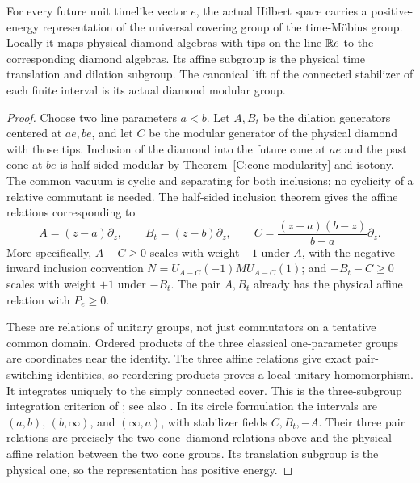 \begin{theorem}\label{C:time-mobius}
For every future unit timelike vector $e$, the actual
Hilbert space carries a positive-energy representation
of the universal covering group of the time-M\"obius
group. Locally it maps physical diamond algebras with
tips on the line $\mathbb R e$ to the corresponding diamond
algebras. Its affine subgroup is the physical time
translation and dilation subgroup. The canonical lift of
the connected stabilizer of each finite interval is its
actual diamond modular group.
\end{theorem}

\begin{proof}
Choose two line parameters $a<b$. Let $A,B_t$ be the
dilation generators centered at $ae,be$, and let $C$
be the modular generator of the physical diamond with
those tips. Inclusion of the diamond into the future
cone at $ae$ and the past cone at $be$ is half-sided
modular by Theorem~\ref{C:cone-modularity} and isotony.
The common vacuum is cyclic and separating for both
inclusions; no cyclicity of a relative commutant is
needed. The half-sided inclusion theorem gives the
affine relations corresponding to
\begin{equation}\label{C:three-mobius-fields}
 A=(z-a)\partial_z,\qquad
 B_t=(z-b)\partial_z,\qquad
 C=\frac{(z-a)(b-z)}{b-a}\partial_z.
\end{equation}
More specifically, $A-C\ge0$ scales with weight $-1$
under $A$, with the negative inward inclusion convention
$N=U_{A-C}(-1)MU_{A-C}(1)$; and $-B_t-C\ge0$ scales
with weight $+1$ under $-B_t$. The pair $A,B_t$
already has the physical affine relation with
$P_e\ge0$.

These are relations of unitary groups, not just
commutators on a tentative common domain. Ordered
products of the three classical one-parameter groups
are coordinates near the identity. The three affine
relations give exact pair-switching identities, so
reordering products proves a local unitary
homomorphism. It integrates uniquely to the simply
connected cover. This is the three-subgroup
integration criterion of
\cite[Lemma~1.1]{GuidoLongoWiesbrock1998}; see also
\cite[Lemmas~2.3--2.4]{MorinelliTanimoto2019}.
In its circle formulation the intervals are $(a,b)$, $(b,\infty)$,
and $(\infty,a)$, with stabilizer fields $C,B_t,-A$. Their three
pair relations are precisely the two cone--diamond relations above
and the physical affine relation between the two cone groups.
Its translation subgroup is the physical one, so
the representation has positive energy.


\end{proof}
